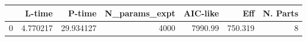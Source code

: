 \begin{tabular}{lrrrrrr}
\toprule
{} &    L-time &     P-time &  N\_params\_expt &  AIC-like &      Eff &  N. Parts \\
\midrule
0 &  4.770217 &  29.934127 &           4000 &   7990.99 &  750.319 &         8 \\
\bottomrule
\end{tabular}
